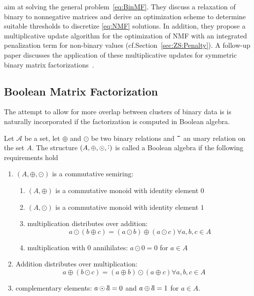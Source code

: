 \cite{zhang2007binary,zhang2010binary} aim at solving the general problem~\eqref{eq:BinMF}. They discuss a relaxation of binary to nonnegative matrices and derive an optimization scheme to determine suitable thresholds to discretize \ref{eq:NMF} solutions. In addition, they propose a multiplicative update algorithm for the optimization of NMF with an integrated penalization term for non-binary values (cf.\@ Section~\ref{sec:ZS:Penalty}). A follow-up paper discusses the application of these multiplicative updates for symmetric binary matrix factorizations~\citep{zhang2013overlapping}. 
\subsection{Boolean Matrix Factorization}\label{sec:ZS:BooleanMF}
The attempt to allow for more overlap between clusters of binary data is  is naturally incorporated if the factorization is computed in Boolean algebra. 
\begin{definition}\label{def:BoolAlgebra}
Let $\mathcal{A}$ be a set, let $\oplus$ and $\odot$ be two binary relations and $\thickbar{\phantom{a}}$ an unary relation on the set $A$. The structure $(A,\oplus,\odot,\thickbar{\cdot})$ is called a Boolean algebra if the following requirements hold
\begin{enumerate}
    \item $(A,\oplus,\odot)$ is a commutative semiring:
    \begin{enumerate}
        \item $(A,\oplus)$ is a commutative monoid with identity element $0$
        \item $(A,\odot)$ is a commutative monoid with identity element $1$
        \item multiplication distributes over addition:
        \begin{equation*}
            a\odot(b\oplus c) = (a\odot b)\oplus (a\odot c) \forall a,b,c\in A
        \end{equation*}
        \item multiplication with $0$ annihilates: $a\odot 0=0$ for $a\in A$
    \end{enumerate}
    \item Addition distributes over multiplication:
    \begin{equation*}
        a\oplus(b\odot c) = (a\oplus b)\odot (a\oplus c) \forall a,b,c\in A
    \end{equation*}
    \item complementary elements: $a\odot \thickbar{a}=0$ and $a\oplus \thickbar{a}=1$ for $a\in A$.
\end{enumerate}
\end{definition}
